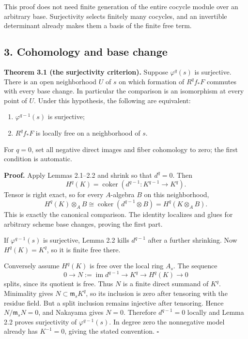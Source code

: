 \documentclass[11pt]{article}
\providecommand{\tightlist}{\setlength{\itemsep}{0pt}\setlength{\parskip}{0pt}}
\begin{document}
This proof does not need finite generation of the entire cocycle module
over an arbitrary base. Surjectivity selects finitely many cocycles, and
an invertible determinant already makes them a basis of the finite free
term.

\subsection{3. Cohomology and base
change}\label{cohomology-and-base-change}

\textbf{Theorem 3.1 (the surjectivity criterion).} Suppose
\(\varphi^q(s)\) is surjective. There is an open neighborhood \(U\) of
\(s\) on which formation of \(R^qf_*F\) commutes with every base change.
In particular the comparison is an isomorphism at every point of \(U\).
Under this hypothesis, the following are equivalent:

\begin{enumerate}
\def\labelenumi{\arabic{enumi}.}
\tightlist
\item
  \(\varphi^{q-1}(s)\) is surjective;
\item
  \(R^qf_*F\) is locally free on a neighborhood of \(s\).
\end{enumerate}

For \(q=0\), set all negative direct images and fiber cohomology to
zero; the first condition is automatic.

\textbf{Proof.} Apply Lemmas 2.1--2.2 and shrink so that \(d^q=0\). Then
\[
H^q(K)=\operatorname{coker}(d^{q-1}:K^{q-1}\to K^q).
\] Tensor is right exact, so for every \(A\)-algebra \(B\) on this
neighborhood, \[
H^q(K)\otimes_A B
\cong\operatorname{coker}(d^{q-1}\otimes B)
=H^q(K\otimes_A B).
\] This is exactly the canonical comparison. The identity localizes and
glues for arbitrary scheme base changes, proving the first part.

If \(\varphi^{q-1}(s)\) is surjective, Lemma 2.2 kills \(d^{q-1}\) after
a further shrinking. Now \(H^q(K)=K^q\), so it is finite free there.

Conversely assume \(H^q(K)\) is free over the local ring \(A_s\). The
sequence \[
0\to N:=\operatorname{im}d^{q-1}\to K^q\to H^q(K)\to0
\] splits, since its quotient is free. Thus \(N\) is a finite direct
summand of \(K^q\). Minimality gives \(N\subset\mathfrak m_sK^q\), so
its inclusion is zero after tensoring with the residue field. But a
split inclusion remains injective after tensoring. Hence
\(N/\mathfrak m_sN=0\), and Nakayama gives \(N=0\). Therefore
\(d^{q-1}=0\) locally and Lemma 2.2 proves surjectivity of
\(\varphi^{q-1}(s)\). In degree zero the nonnegative model already has
\(K^{-1}=0\), giving the stated convention. \(\square\)
\end{document}
